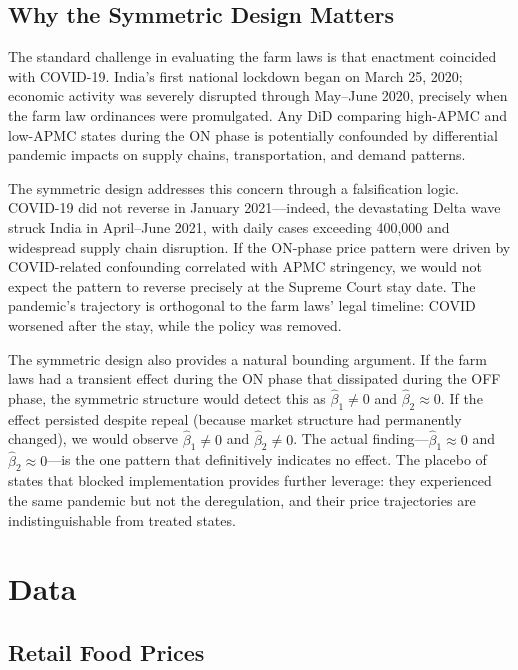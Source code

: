 \documentclass[12pt]{article}
\begin{document}
\subsection{Why the Symmetric Design Matters}

The standard challenge in evaluating the farm laws is that enactment coincided with COVID-19. India's first national lockdown began on March 25, 2020; economic activity was severely disrupted through May--June 2020, precisely when the farm law ordinances were promulgated. Any DiD comparing high-APMC and low-APMC states during the ON phase is potentially confounded by differential pandemic impacts on supply chains, transportation, and demand patterns.

The symmetric design addresses this concern through a falsification logic. COVID-19 did not reverse in January 2021---indeed, the devastating Delta wave struck India in April--June 2021, with daily cases exceeding 400,000 and widespread supply chain disruption. If the ON-phase price pattern were driven by COVID-related confounding correlated with APMC stringency, we would not expect the pattern to reverse precisely at the Supreme Court stay date. The pandemic's trajectory is orthogonal to the farm laws' legal timeline: COVID worsened after the stay, while the policy was removed.

The symmetric design also provides a natural bounding argument. If the farm laws had a transient effect during the ON phase that dissipated during the OFF phase, the symmetric structure would detect this as $\hat{\beta}_1 \neq 0$ and $\hat{\beta}_2 \approx 0$. If the effect persisted despite repeal (because market structure had permanently changed), we would observe $\hat{\beta}_1 \neq 0$ and $\hat{\beta}_2 \neq 0$. The actual finding---$\hat{\beta}_1 \approx 0$ and $\hat{\beta}_2 \approx 0$---is the one pattern that definitively indicates no effect. The placebo of states that blocked implementation provides further leverage: they experienced the same pandemic but not the deregulation, and their price trajectories are indistinguishable from treated states.


\section{Data}

\subsection{Retail Food Prices}
\end{document}
